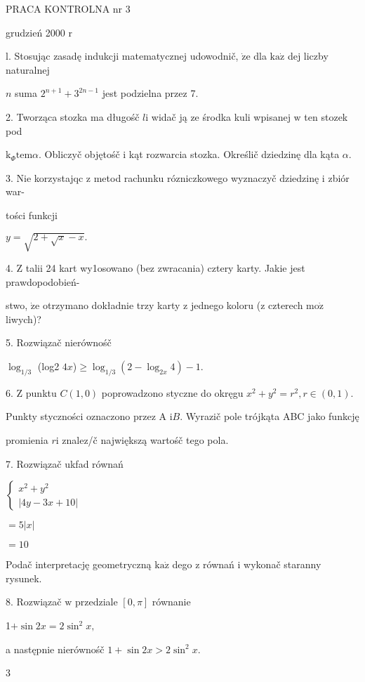 \documentclass[a4paper,12pt]{article}
\begin{document}
PRACA KONTROLNA nr 3

grudzień 2000 $\mathrm{r}$

l. Stosując zasadę indukcji matematycznej udowodnič, $\dot{\mathrm{z}}\mathrm{e}$ dla $\mathrm{k}\mathrm{a}\dot{\mathrm{z}}$ dej liczby naturalnej

$n$ suma $2^{n+1}+3^{2n-1}$ jest podzielna przez 7.

2. Tworząca stozka ma długośč $l\mathrm{i}$ widač ją ze środka kuli wpisanej $\mathrm{w}$ ten stozek pod

$\mathrm{k}_{\Phi}\mathrm{t}\mathrm{e}\mathrm{m}\alpha$. Obliczyč objętośč $\mathrm{i}$ kąt rozwarcia stozka. Określič dziedzinę dla kąta $\alpha.$

3. Nie korzystajqc $\mathrm{z}$ metod rachunku rózniczkowego wyznaczyč dziedzinę $\mathrm{i}$ zbiór war-

tości funkcji

$y=\sqrt{2+\sqrt{x}-x}.$

4. $\mathrm{Z}$ talii 24 kart wy1osowano (bez zwracania) cztery karty. Jakie jest prawdopodobień-

stwo, $\dot{\mathrm{z}}\mathrm{e}$ otrzymano dokładnie trzy karty $\mathrm{z}$ jednego koloru ($\mathrm{z}$ czterech $\mathrm{m}\mathrm{o}\dot{\mathrm{z}}$ liwych)?

5. Rozwiązač nierównośč

$\log_{1/3}$ (log2 $4x$)$\geq\log_{1/3}(2-\log_{2x}4)-1.$

6. $\mathrm{Z}$ punktu $C(1,0)$ poprowadzono styczne do okręgu $x^{2}+y^{2} =r^{2}, r \in (0,1).$

Punkty styczności oznaczono przez A $\mathrm{i}B$. Wyrazič pole trójkąta ABC jako funkcję

promienia $r\mathrm{i}$ znalez/č największą wartośč tego pola.

7. Rozwiązač ukfad równań

$\left\{\begin{array}{l}
x^{2}+y^{2}\\
|4y-3x+10|
\end{array}\right.$

$=5|x|$

$=10$

Podač interpretację geometryczną $\mathrm{k}\mathrm{a}\dot{\mathrm{z}}$ dego $\mathrm{z}$ równań $\mathrm{i}$ wykonač staranny rysunek.

8. Rozwiązač $\mathrm{w}$ przedziale $[0,\pi]$ równanie

1$+ \sin 2x=2\sin^{2}x,$

a następnie nierównośč $1+\sin 2x>2\sin^{2}x.$

3
\end{document}

